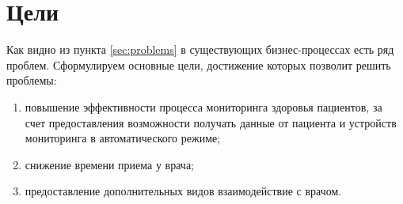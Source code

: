 \newpage
{}
\section{Цели}
Как видно из пункта \ref{sec:problems} в существующих бизнес-процессах есть ряд
проблем. Сформулируем основные цели, достижение которых позволит решить
проблемы:

\begin{enumerate}
  \item повышение эффективности процесса мониторинга здоровья пациентов, 
  за счет предоставления возможности получать данные от пациента и устройств
  мониторинга в автоматического режиме;
  \item снижение времени приема у врача;
  \item предоставление дополнительных видов взаимодействие с врачом.
\end{enumerate}


